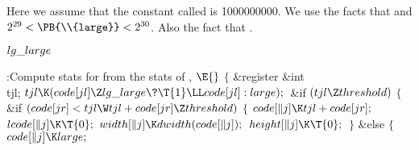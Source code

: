 Here we assume that the constant called  is
1000000000.
We use the facts that  and $2^{29}<\PB{%
\\{large}}<2^{30}$.
Also the fact that .

\Y\B\4\D$\\{lg\_large}$ \5
\par
\Y\B\4:Compute stats for  from the stats of , \X${}\E{}$\6
${}\{{}$\1\6
\&{register} \&{int} \\{tjl};\7
${}\\{tjl}\K(\\{code}[\\{jl}]\Z\\{lg\_large}\?\T{1}\LL\\{code}[\\{jl}]:%
\\{large});{}$\6
\&{if} ${}(\\{tjl}\Z\\{threshold}){}$\5
${}\{{}$\1\6
\&{if} ${}(\\{code}[\\{jr}]<\\{tjl}\W\\{tjl}+\\{code}[\\{jr}]\Z%
\\{threshold}){}$\5
${}\{{}$\1\6
${}\\{code}[\|j]\K\\{tjl}+\\{code}[\\{jr}];{}$\6
${}\\{lcode}[\|j]\K\T{0};{}$\6
${}\\{width}[\|j]\K\\{dwidth}(\\{code}[\|j]);{}$\6
${}\\{height}[\|j]\K\T{0};{}$\6
\4${}\}{}$\2\6
\&{else}\5
${}\{{}$\1\6
${}\\{code}[\|j]\K\\{large};{}$\6
